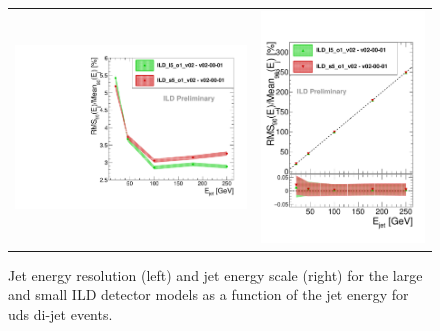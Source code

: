 %
% 
\begin{figure}[b!]
\begin{tabular}{cc}
\includegraphics[width=0.5\hsize]{Performance/fig/JERLargeSmall_v02-00-01.pdf} &
\includegraphics[width=0.5\hsize]{Performance/fig/JESLargeSmall_v02-00-01.pdf}
\end{tabular}
\caption{\label{fig:perf:trkeff_jer_ls} Jet energy resolution (left) and jet energy scale (right) for the large and small ILD detector
models as a function of the jet energy for uds di-jet events.}
 \end{figure}


